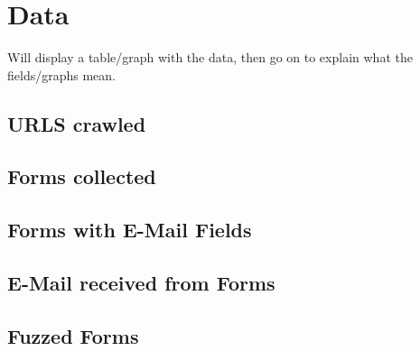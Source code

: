\section{Data}
Will display a table/graph with the data, then go on to explain what the fields/graphs mean.

\subsection{URLS crawled}
\subsection{Forms collected}
\subsection{Forms with E-Mail Fields}
\subsection{E-Mail received from Forms}
\subsection{Fuzzed Forms}
